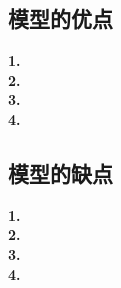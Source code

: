 \documentclass[../main.tex]{subfiles}
\begin{document}
\subsection{模型的优点}
\noindent\textbf{1.}
\\
\textbf{2.}
\\
\textbf{3.}
\\
\textbf{4.}
\subsection{模型的缺点}
\noindent\textbf{1.}
\\
\textbf{2.}
\\
\textbf{3.}
\\
\textbf{4.}
\end{document}
